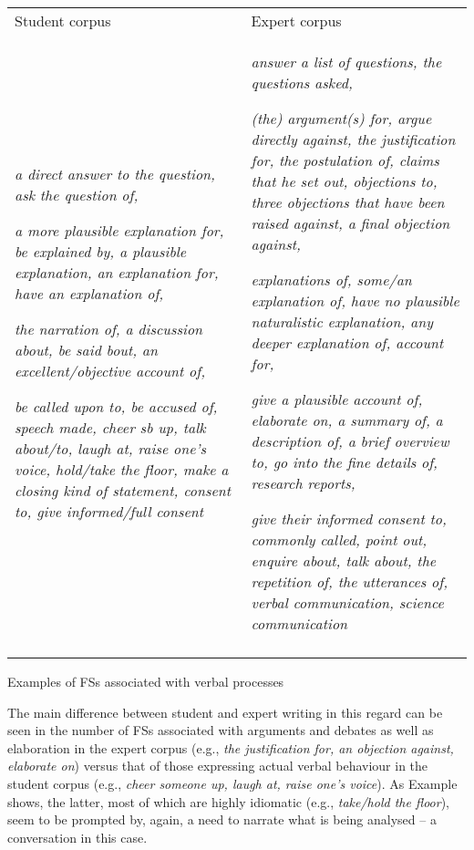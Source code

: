 \begin{tabularx}{\textwidth}{XX}

\lsptoprule

Student corpus & Expert corpus\\
\textit{a direct answer to the question, ask the question of,} 

\textit{a more plausible explanation for, be explained by, a plausible explanation, an explanation for, have an explanation of,}

\textit{the narration of, a discussion about, be said bout, an excellent/objective account of,}

\textit{be called upon to, be accused of, speech made, cheer sb up, talk about/to, laugh at, raise one’s voice, hold/take the floor, make a closing kind of statement, consent to, give informed/full consent} & \textit{answer a list of questions, the questions asked,} 

\textit{(the) argument(s) for, argue directly against, the justification for, the postulation of, claims that he set out, objections to, three objections that have been raised against, a final objection against,} 

\textit{explanations of, some/an explanation of, have no plausible naturalistic explanation, any deeper explanation of, account for,} 

\textit{give a plausible account of, elaborate on, a summary of, a description of, a brief overview to, go into the fine details of, research reports,}

\textit{give their informed consent to, commonly called, point out, enquire about, talk about, the repetition of, the utterances of, verbal communication, science communication}\\
\lspbottomrule
\end{tabularx}
\begin{table}
\caption{Examples of FSs associated with verbal processes}
\label{tab:key:7}
\end{table}

The main difference between student and expert writing in this regard can be seen in the number of FSs associated with arguments and debates as well as elaboration in the expert corpus (e.g., \textit{the justification for, an objection against, elaborate on}) versus that of those expressing actual verbal behaviour in the student corpus (e.g., \textit{cheer someone up, laugh at, raise one’s voice}). As Example  shows, the latter, most of which are highly idiomatic (e.g., \textit{take/hold the floor}), seem to be prompted by, again, a need to narrate what is being analysed – a conversation in this case.

